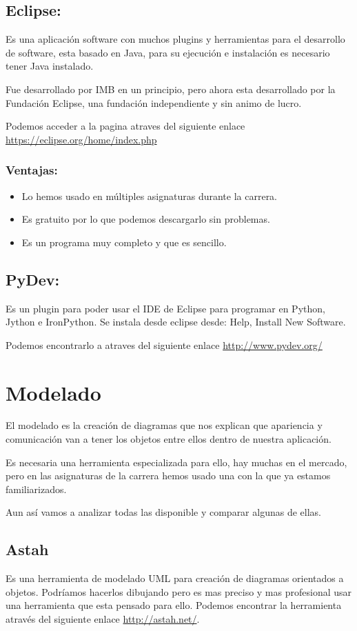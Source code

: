 \subsection{Eclipse:}
Es una aplicación software con muchos plugins y herramientas para el desarrollo de software, esta basado en Java, para su ejecución e instalación es necesario tener Java instalado.

Fue desarrollado por IMB en un principio, pero ahora esta desarrollado por la Fundación Eclipse, una fundación independiente y sin animo de lucro.


Podemos acceder a la pagina atraves del siguiente enlace  \url{https://eclipse.org/home/index.php}

\subsubsection{Ventajas:}
\begin{itemize}
	\item Lo hemos usado en múltiples asignaturas durante la carrera.
	\item Es gratuito por lo que podemos descargarlo sin problemas.
	\item Es un programa muy completo y que es sencillo.
\end{itemize}

\subsection{PyDev:}
Es un plugin para poder usar el IDE de Eclipse para programar en Python, Jython e IronPython.
Se instala desde eclipse desde: Help, Install New Software.

Podemos encontrarlo a atraves del siguiente enlace \url{http://www.pydev.org/}

\section{Modelado}
El modelado es la creación de diagramas que nos explican que apariencia y comunicación van a tener los objetos entre ellos dentro de nuestra aplicación.

Es necesaria una herramienta especializada para ello, hay muchas en el mercado, pero en las asignaturas de la carrera hemos usado una con la que ya estamos familiarizados.

Aun así vamos a analizar todas las disponible y comparar algunas de ellas.


\subsection{Astah}
Es una herramienta de modelado UML para creación de diagramas orientados a objetos.
Podríamos hacerlos dibujando pero es mas preciso y mas profesional usar una herramienta que esta pensado para ello.
Podemos encontrar la herramienta através del siguiente enlace  
\url{http://astah.net/}.

